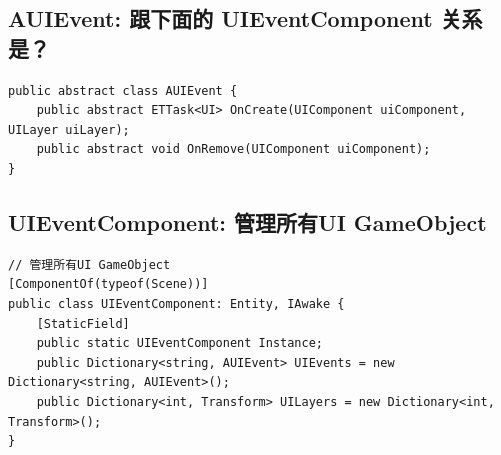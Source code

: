 \documentclass[9pt, b5paper]{article}
\begin{document}
\subsection{AUIEvent: 跟下面的 UIEventComponent 关系是？}
\label{sec-7-7}
\begin{verbatim}
public abstract class AUIEvent {
    public abstract ETTask<UI> OnCreate(UIComponent uiComponent, UILayer uiLayer);
    public abstract void OnRemove(UIComponent uiComponent);
}
\end{verbatim}
\subsection{UIEventComponent: 管理所有UI GameObject}
\label{sec-7-8}
\begin{verbatim}
// 管理所有UI GameObject
[ComponentOf(typeof(Scene))]
public class UIEventComponent: Entity, IAwake {
    [StaticField]
    public static UIEventComponent Instance;
    public Dictionary<string, AUIEvent> UIEvents = new Dictionary<string, AUIEvent>();
    public Dictionary<int, Transform> UILayers = new Dictionary<int, Transform>();
}
\end{verbatim}
\end{document}
